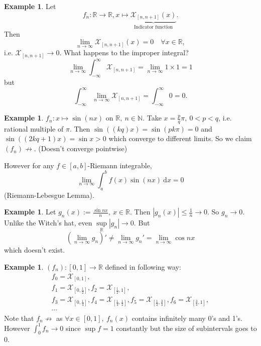 \documentclass[a4paper]{article}
\theoremstyle{definition}
\newtheorem{example}[defn]{Example}
\begin{document}
\begin{example}
Let
\[
f_n:\mathbb R\rightarrow \mathbb R, x\mapsto \underbrace{\mathcal X_{[n,n+1]}(x)}_{\text{Indicator function}}.
\]
Then
\[
\lim_{n\rightarrow \infty} \mathcal X_{[n,n+1]}(x)=0 \quad \forall x\in \mathbb R ,
\]
i.e. $\mathcal X_{[n,n+1]} \rightarrow 0$. What happens to the improper integral?
\[
\lim_{n\rightarrow \infty} \int_{-\infty}^\infty \mathcal X_{[n,n+1]}=\lim_{n\rightarrow \infty} 1\times 1 = 1
\]
but
\[
\int_{-\infty}^\infty \lim_{n\rightarrow \infty} \mathcal X_{[n,n+1]}=\int_{-\infty}^\infty 0=0.
\]
\end{example}

\begin{example}
$f_n:x\mapsto \sin (nx)$ on $\mathbb R,\ n\in \mathbb N$. Take $\displaystyle x=\frac{p}{q}\pi,\ 0<p<q$, i.e. rational multiple of $\pi$. Then $\sin ((kq)x)=\sin(pk\pi)=0$ and $\sin((2kq+1)x) = \sin x >0$ which converge to different limits. So we claim $(f_n) \not\rightarrow .$ (Doesn't converge pointwise)

However for any $f\in [a,b]$-Riemann integrable,
\[
\lim_{n\rightarrow \infty} \int_a^b f(x) \sin (nx) \ \mathrm d x =0
\]
(Riemann-Lebesgue Lemma).
\end{example}

\begin{example}
Let $g_n(x):=\frac{\sin n x}{n},\ x\in \mathbb R$. Then $|g_n(x)|\leq \frac{1}{n} \rightarrow 0$. So $g_n\rightarrow 0$. Unlike the Witch's hat, even $\underset{\mathbb R}{\sup}|g_n|\rightarrow 0$. But
\[
\left(\lim_{n\rightarrow \infty}g_n\right)'\neq \lim_{n\rightarrow \infty} g_n' = \lim_{n\rightarrow \infty} \cos n x
\]
which doesn't exist.
\end{example}

\begin{example}
$(f_n):[0,1]\rightarrow \mathbb R$ defined in following way:
\[
\begin{aligned}f_0=\mathcal X_{[0,1]},\\f_1=\mathcal X_{\left[0,\frac12\right]},f_2=\mathcal X_{\left[\frac12,1\right]},\\f_3=\mathcal X_{\left[0,\frac14\right]},f_4=\mathcal X_{\left[\frac14,\frac12\right]},f_5=\mathcal X_{\left[\frac12,\frac34\right]},f_6=\mathcal X_{\left[\frac34,1\right]},\\ \cdots\end{aligned}
\]
Note that $f_n \not\rightarrow$ as $\forall x\in [0,1], \ f_n(x)$ contains infinitely many 0's and 1's. However $\int_0^1 f_n \rightarrow 0$ since $\sup f=1$ constantly but the size of subintervals goes to 0.
\end{example}
\end{document}
